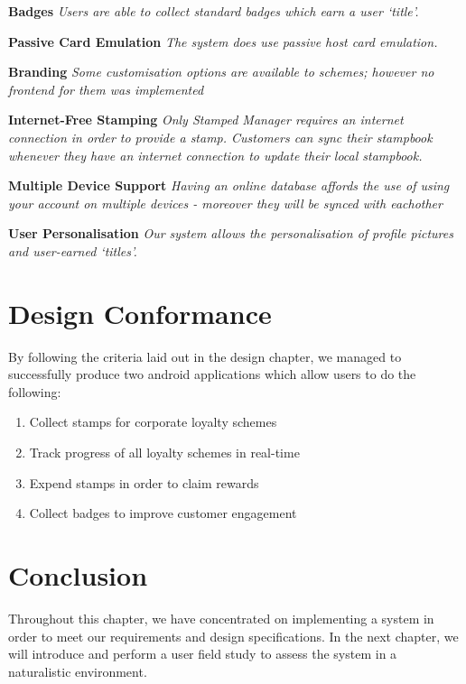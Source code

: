 \begin{description}[leftmargin=!,labelwidth=\widthof{\bfseries Medium}]
    \item[S3] \textbf{Badges} \newline
        \textit{Users are able to collect standard badges which earn a user `title'.}
     	
    \item[C1] \textbf{Passive Card Emulation} \newline
        \textit{The system does use passive host card emulation.}

    \item[C2] \textbf{Branding} \newline
        \textit{Some customisation options are available to schemes; however no frontend for them was implemented}

    \item[C3] \textbf{Internet-Free Stamping} \newline
        \textit{Only Stamped Manager requires an internet connection in order to provide a stamp. Customers can sync their stampbook whenever they have an internet connection to update their local stampbook.}
        
    \item[C4] \textbf{Multiple Device Support} \newline
        \textit{Having an online database affords the use of using your account on multiple devices - moreover they will be synced with eachother}
        
    \item[C5] \textbf{User Personalisation} \newline
        \textit{Our system allows the personalisation of profile pictures and user-earned `titles'.}
\end{description}

\newpage

\section{Design Conformance}
By following the criteria laid out in the design chapter, we managed to successfully produce two android applications which allow users to do the following:

\begin{enumerate}
	\item Collect stamps for corporate loyalty schemes
	\item Track progress of all loyalty schemes in real-time
	\item Expend stamps in order to claim rewards
	\item Collect badges to improve customer engagement
\end{enumerate} 

\section{Conclusion}
Throughout this chapter, we have concentrated on implementing a system in order to meet our requirements and design specifications. In the next chapter, we will introduce and perform a user field study to assess the system in a naturalistic environment.